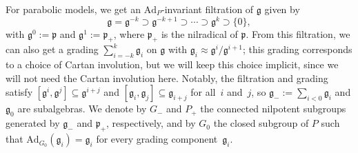 \documentclass[10pt,a4paper]{amsart}
\numberwithin{equation}{section}
\theoremstyle{definition}
\newcommand{\Ad}{\mathrm{Ad}}
\begin{document}
For parabolic models, we get an $\Ad_P$-invariant filtration of $\mathfrak{g}$ given by \[\mathfrak{g}=\mathfrak{g}^{-k}\supset\mathfrak{g}^{-k+1}\supset\cdots\supset\mathfrak{g}^k\supset\{0\},\] with $\mathfrak{g}^0:=\mathfrak{p}$ and $\mathfrak{g}^1:=\mathfrak{p}_+$, where $\mathfrak{p}_+$ is the nilradical of $\mathfrak{p}$. From this filtration, we can also get a grading $\sum_{i=-k}^k\mathfrak{g}_i$ on $\mathfrak{g}$ with $\mathfrak{g}_i\approx\mathfrak{g}^i/\mathfrak{g}^{i+1}$; this grading corresponds to a choice of Cartan involution, but we will keep this choice implicit, since we will not need the Cartan involution here. Notably, the filtration and grading satisfy $[\mathfrak{g}^i,\mathfrak{g}^j]\subseteq\mathfrak{g}^{i+j}$ and $[\mathfrak{g}_i,\mathfrak{g}_j]\subseteq\mathfrak{g}_{i+j}$ for all~$i$ and~$j$, so $\mathfrak{g}_-:=\sum_{i<0}\mathfrak{g}_i$ and $\mathfrak{g}_0$ are subalgebras. We denote by $G_-$ and $P_+$ the connected nilpotent subgroups generated by $\mathfrak{g}_-$ and $\mathfrak{p}_+$, respectively, and by $G_0$ the closed subgroup of $P$ such that $\Ad_{G_0}(\mathfrak{g}_i)=\mathfrak{g}_i$ for every grading component~$\mathfrak{g}_i$.
\end{document}
